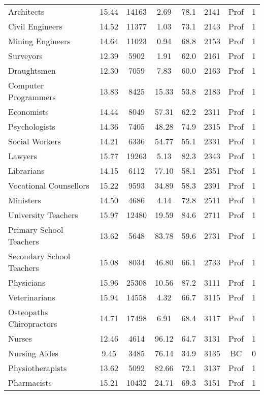 \documentclass[12pt,letterpaper]{article}
\begin{document}
\begin{enumerate}
\begin{table}[H]
\begin{adjustbox}{width=0.9\textwidth}
\begin{tabular}{lccccccc}
			Architects & 15.44 & 14163 & 2.69 & 78.1 & 2141 & Prof & 1 \\
			Civil Engineers & 14.52 & 11377 & 1.03 & 73.1 & 2143 & Prof & 1 \\
			Mining Engineers & 14.64 & 11023 & 0.94 & 68.8 & 2153 & Prof & 1 \\
			Surveyors & 12.39 & 5902 & 1.91 & 62.0 & 2161 & Prof & 1 \\
			Draughtsmen & 12.30 & 7059 & 7.83 & 60.0 & 2163 & Prof & 1 \\
			Computer Programmers & 13.83 & 8425 & 15.33 & 53.8 & 2183 & Prof & 1 \\
			Economists & 14.44 & 8049 & 57.31 & 62.2 & 2311 & Prof & 1 \\
			Psychologists & 14.36 & 7405 & 48.28 & 74.9 & 2315 & Prof & 1 \\
			Social Workers & 14.21 & 6336 & 54.77 & 55.1 & 2331 & Prof & 1 \\
			Lawyers & 15.77 & 19263 & 5.13 & 82.3 & 2343 & Prof & 1 \\
			Librarians & 14.15 & 6112 & 77.10 & 58.1 & 2351 & Prof & 1 \\
			Vocational Counsellors & 15.22 & 9593 & 34.89 & 58.3 & 2391 & Prof & 1 \\
			Ministers & 14.50 & 4686 & 4.14 & 72.8 & 2511 & Prof & 1 \\
			University Teachers & 15.97 & 12480 & 19.59 & 84.6 & 2711 & Prof & 1 \\
			Primary School Teachers & 13.62 & 5648 & 83.78 & 59.6 & 2731 & Prof & 1 \\
			Secondary School Teachers & 15.08 & 8034 & 46.80 & 66.1 & 2733 & Prof & 1 \\
			Physicians & 15.96 & 25308 & 10.56 & 87.2 & 3111 & Prof & 1 \\
			Veterinarians & 15.94 & 14558 & 4.32 & 66.7 & 3115 & Prof & 1 \\
			Osteopaths Chiropractors & 14.71 & 17498 & 6.91 & 68.4 & 3117 & Prof & 1 \\
			Nurses & 12.46 & 4614 & 96.12 & 64.7 & 3131 & Prof & 1 \\
			Nursing Aides & 9.45 & 3485 & 76.14 & 34.9 & 3135 & BC & 0 \\
			Physiotherapists & 13.62 & 5092 & 82.66 & 72.1 & 3137 & Prof & 1 \\
			Pharmacists & 15.21 & 10432 & 24.71 & 69.3 & 3151 & Prof & 1 
			\end{tabular}
		\end{adjustbox}
	\end{table}


\end{enumerate}
\end{document}
